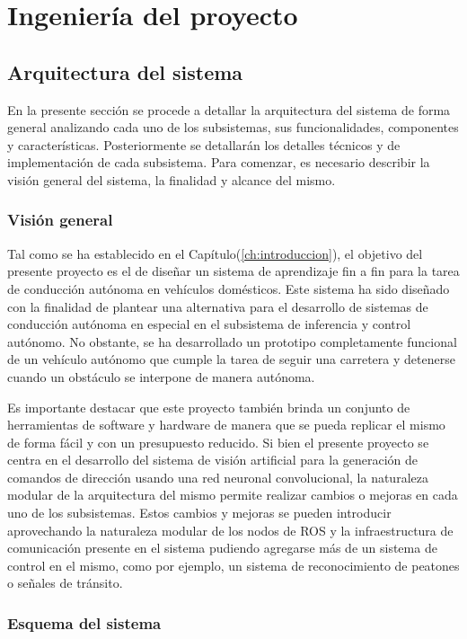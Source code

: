 \chapter{Ingeniería del proyecto}\label{ch:ingenieria}
\section{Arquitectura del sistema}\label{sec:arquitectura}
En la presente sección se procede a detallar la arquitectura del sistema de forma general analizando cada uno de 
los subsistemas, sus funcionalidades, componentes y características. Posteriormente se detallarán los detalles técnicos
y de implementación de cada subsistema. Para comenzar, es necesario describir la visión general del sistema, la finalidad 
y alcance del mismo.

    \subsection{Visión general}
    Tal como se ha establecido en el Capítulo(\ref{ch:introduccion}), el objetivo del presente proyecto es el de diseñar 
    un sistema de aprendizaje fin a fin para la tarea de conducción autónoma en vehículos domésticos. Este sistema ha sido 
    diseñado con la finalidad de plantear una alternativa para el desarrollo de sistemas de conducción autónoma en especial 
    en el subsistema de inferencia y control autónomo. No obstante, se ha desarrollado un prototipo completamente funcional 
    de un vehículo autónomo que cumple la tarea de seguir una carretera y detenerse cuando un obstáculo se interpone de 
    manera autónoma. 

    Es importante destacar que este proyecto también brinda un conjunto de herramientas de software 
    y hardware de manera que se pueda replicar el mismo de forma fácil y con un presupuesto reducido. Si bien el 
    presente proyecto se centra en el desarrollo 
    del sistema de visión artificial para la generación de comandos de dirección usando una red neuronal convolucional, la 
    naturaleza modular de la arquitectura del mismo permite realizar cambios o mejoras en cada uno de los subsistemas. Estos 
    cambios y mejoras se pueden introducir aprovechando la naturaleza modular de los nodos de ROS y la infraestructura de 
    comunicación presente en el sistema pudiendo agregarse más de un sistema de control en el mismo, como por ejemplo, un 
    sistema de reconocimiento de peatones o señales de tránsito.

    \subsection{Esquema del sistema}

